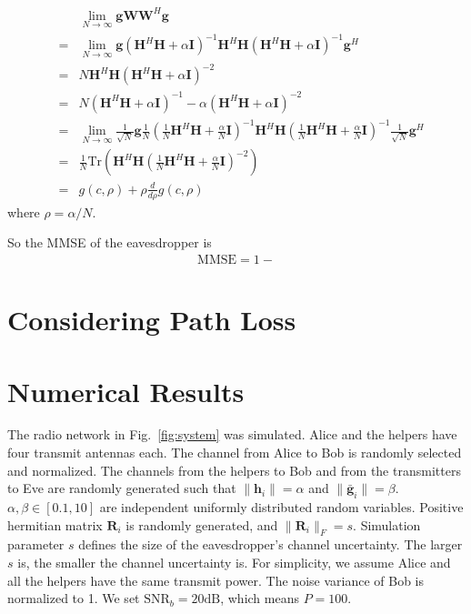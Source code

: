 \documentclass[12pt,journal,draftclsnofoot,onecolumn]{IEEEtran}
\begin{document}
\begin{eqnarray}
&&\lim_{N \to \infty}\mathbf{g}\mathbf{W}\mathbf{W}^H\mathbf{g}\\
&=&\lim_{N \to \infty}\mathbf{g}\left(\mathbf{H}^H\mathbf{H} + \alpha\mathbf{I}\right)^{-1}\mathbf{H}^H\mathbf{H}\left(\mathbf{H}^H\mathbf{H} + \alpha\mathbf{I}\right)^{-1}\mathbf{g}^H\\
&=&N\mathbf{H}^H\mathbf{H}\left(\mathbf{H}^H\mathbf{H} + \alpha\mathbf{I}\right)^{-2}\\
&=&N\left(\mathbf{H}^H\mathbf{H} + \alpha\mathbf{I}\right)^{-1} -\alpha\left(\mathbf{H}^H\mathbf{H} + \alpha\mathbf{I}\right)^{-2}\\
&=&\lim_{N \to \infty}\frac{1}{\sqrt{N}}\mathbf{g}\frac{1}{N}\left(\frac{1}{N}\mathbf{H}^H\mathbf{H} + \frac{\alpha}{N}\mathbf{I}\right)^{-1}\mathbf{H}^H\mathbf{H}\left(\frac{1}{N}\mathbf{H}^H\mathbf{H} + \frac{\alpha}{N} \mathbf{I}\right)^{-1}\frac{1}{\sqrt{N}}\mathbf{g}^H\\
&=&\frac{1}{N}\mathrm{Tr}\left(\mathbf{H}^H\mathbf{H}\left(\frac{1}{N}\mathbf{H}^H\mathbf{H} + \frac{\alpha}{N} \mathbf{I}\right)^{-2}\right) \\ 
&=&g(c,\rho) + \rho\frac{d}{d\rho}g(c,\rho) 
\end{eqnarray}
where $\rho = \alpha/N$.

So the MMSE of the eavesdropper is
\begin{eqnarray}
\mathrm{MMSE} = 1- 
\end{eqnarray}


\section{Considering Path Loss}



\section{Numerical Results} \label{sec:numerical results}
The radio network in Fig.~\ref{fig:system} was simulated. Alice and the helpers have four transmit antennas each. The channel from Alice to Bob is randomly selected and normalized. The channels from the helpers to Bob and from the transmitters to Eve are randomly generated such that $\|\mathbf{h}_i\| = \alpha$ and $\|\bar{\mathbf{g}}_i\| = \beta$. $\alpha,\beta\in  [0.1,10]$ are independent uniformly distributed random variables.
Positive hermitian matrix $\mathbf{R}_i$ is randomly generated, and $\|\mathbf{R}_i\|_F = s$. Simulation parameter $s$ defines the size of the eavesdropper's channel uncertainty. The larger $s$ is, the smaller the channel uncertainty is. 
For simplicity, we assume Alice and all the helpers have the same transmit power. 
The noise variance of Bob is normalized to 1. We set $\mathrm{SNR}_b = 20 \mathrm{dB}$, which means $P = 100$.
\end{document}
